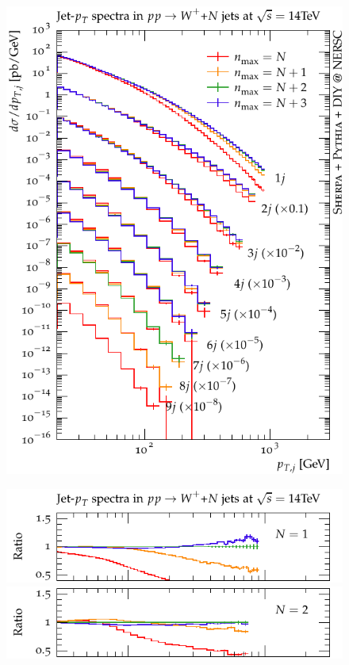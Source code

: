 \documentclass[aps,prd,twocolumn,fleqn,superscriptaddress,groupedaddress,nofootinbib,preprintnumbers]{revtex4}
\begin{document}
\begin{figure}[t]
    \centering
    \begin{minipage}{0.475\textwidth}
      \includegraphics[width=\linewidth]{fig/wpj/jet_pT_main.pdf}
    \end{minipage}\hfill
    \begin{minipage}{0.475\textwidth}
      \includegraphics[width=\textwidth]{fig/wpj/jet_pT_diff_1.pdf}\\[-1mm]
      \includegraphics[width=\textwidth]{fig/wpj/jet_pT_diff_2.pdf}\\[-1mm]

\end{minipage}
\end{figure}
\end{document}
